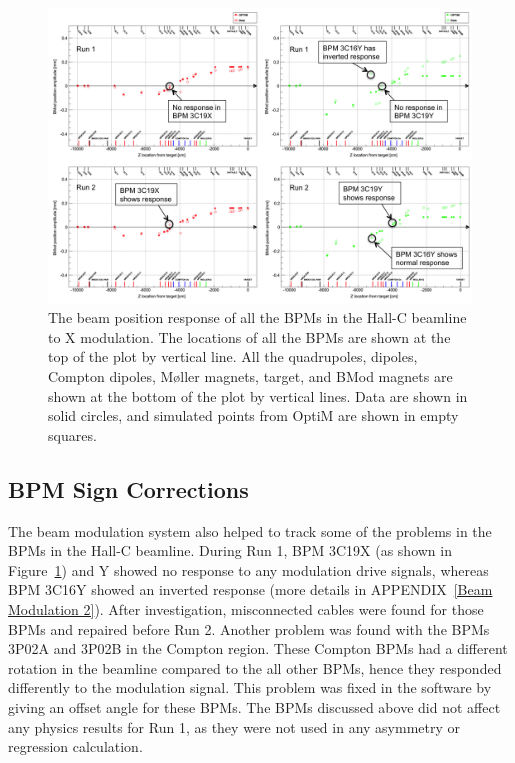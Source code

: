 \begin{singlespace}
\begin{figure}[!h]
	\begin{center}
	\includegraphics[width=15.0cm]{figures/BModBPMSignCorrection}
	\end{center}
	\caption
	{The beam position response of all the BPMs in the Hall-C beamline to X modulation. The locations of all the BPMs are shown at the top of the plot by vertical line. All the quadrupoles, dipoles, Compton dipoles, M{\o}ller magnets, target, and BMod magnets are shown at the bottom of the plot by vertical lines. Data are shown in solid circles, and simulated points from OptiM are shown in empty squares.}
	\label{fig:BModBPMSignCorrection}
\end{figure}
\end{singlespace}


\subsection{BPM Sign Corrections}
\label{BPM Sign Corrections}

The beam modulation system also helped to track some of the problems in the BPMs in the Hall-C beamline. During Run 1, BPM 3C19X (as shown in Figure~\ref{fig:BModBPMSignCorrection}) and Y showed no response to any modulation drive signals, whereas BPM 3C16Y showed an inverted response (more details in APPENDIX~\ref{Beam Modulation 2}). After investigation, misconnected cables were found for those BPMs and repaired before Run 2. 
Another problem was found with the BPMs 3P02A and 3P02B in the Compton region. These Compton BPMs had a different rotation in the beamline compared to the all other BPMs, hence they responded differently to the modulation signal. This problem was fixed in the software by giving an offset angle for these BPMs.
The BPMs discussed above did not affect any physics results for Run 1, as they were not used in any asymmetry or regression calculation. 

